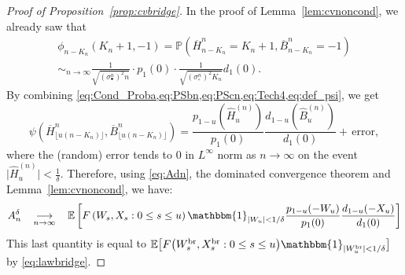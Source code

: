 \documentclass[AHL,XML,longabstracts,Unicode]{cedram}
\def\scn{\sigma_{\circ}^{n}}
\def\sbn{\sigma_{\bullet}^{n}}
\def\oB{\overline{B}}
\def\hB{\widehat{B}}
\def\oH{\overline{H}}
\def\hH{\widehat{H}}
\newcommand\Es[1]{\mathbb{E}\left[#1\right]}
\newcommand\Esb[1]{\mathbb{E}\big[#1\big]}
\renewcommand\Pr[1]{\mathbb{P}\left(#1\right)}
\begin{document}
\begin{proof}[Proof of Proposition~\ref{prop:cvbridge}]
In the proof of Lemma~\ref{lem:cvnoncond}, we already saw that
\begin{multline}
  \phi_{n-K_{n}} (K_{n}+1,-1) =\Pr{\oH^{n}_{n-K_{n}}=K_{n}+1, \oB^{n}_{n-K_{n}}=-1} \\
  \mathop{\sim}_{n \rightarrow \infty}   \frac{1}{ \sqrt{ (\sbn)^{2} n}  } \cdot   p_{1}  (0) \cdot  \frac{1}{\sqrt{ (\scn)^{2} K_{n}}} d_{1}(0).
  \label{eq:Cond_Proba}
\end{multline}
By combining \cref{eq:Cond_Proba,eq:PSbn,eq:PScn,eq:Tech4,eq:def_psi}, we get
\begin{equation}
   \psi \left( \oH^{n}_{ \lfloor u (n-K_{n}) \rfloor },\oB^{n}_{ \lfloor u (n-K_{n}) \rfloor }\right)
=  \frac{p_{1-u}(\hH^{(n)}_{u})}{p_{1}(0)} \frac{d_{1-u}(\hB^{(n)}_{u})}{d_{1}(0)} +\, \text{error},
\label{eq:limit_psi}
\end{equation}
where the (random) error tends to $0$ in $L^\infty$ norm as $n \to \infty$ on the event $ \big| \hH^{(n)}_{u} \big| < \tfrac{1}{\delta}$.
Therefore, using \eqref{eq:Adn}, the dominated convergence theorem and Lemma~\ref{lem:cvnoncond}, we have:
\begin{equation}
\label{eq:cvu0}A^{\delta}_{n}  \quad \mathop{\longrightarrow}_{n \rightarrow \infty} \quad  \Es{F \left(   W_{s},X_{s} : 0 \leq s \leq u \right)  \mathbbm{1}_{|W_{u}|<1/\delta} \frac{p_{1-u}(-W_{u})}{p_{1}(0)} \frac{d_{1-u}(-X_{u})}{d_{1}(0)} }
\end{equation}
This last quantity is equal to $\Esb{F \big(  W^{\textrm{br}}_{s},X^{\textrm{br}}_{s} : 0 \leq s \leq u \big)  \mathbbm{1}_{|W^{\textrm{br}}_{u}|<1/\delta}}$ by \eqref{eq:lawbridge}.



\end{proof}
\end{document}
